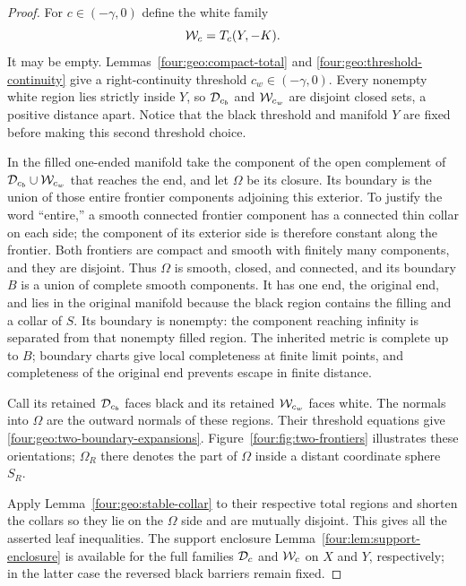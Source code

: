 \begin{proof}
For $c\in(-\gamma,0)$ define the white family
\[
 \mathcal W_c=T_c(Y,-K).
\]
It may be empty.  Lemmas~\ref{four:geo:compact-total} and
\ref{four:geo:threshold-continuity} give a right-continuity threshold
$c_w\in(-\gamma,0)$.  Every nonempty white region lies strictly inside
$Y$, so $\mathcal D_{c_b}$ and $\mathcal W_{c_w}$ are disjoint closed sets, a positive
distance apart.  Notice that the black threshold and manifold $Y$ are
fixed before making this second threshold choice.

In the filled one-ended manifold take the component of the open
complement of $\mathcal D_{c_b}\cup\mathcal W_{c_w}$ that reaches the end, and let
$\Omega$ be its closure.  Its boundary is the union of those entire
frontier components adjoining this exterior.  To justify the word
``entire,'' a smooth connected frontier component has a connected thin
collar on each side; the component of its exterior side is therefore
constant along the frontier.  Both frontiers are compact and smooth with
finitely many components, and they are disjoint.  Thus $\Omega$ is smooth,
closed, and connected, and its boundary $B$ is a union of complete smooth
components.  It has one end, the original end, and lies in the original
manifold because the black region contains the filling and a collar of
$S$.  Its boundary is nonempty: the component reaching infinity is
separated from that nonempty filled region.  The inherited metric is
complete up to $B$; boundary charts give local completeness at finite
limit points, and completeness of the original end prevents escape in
finite distance.

Call its retained $\mathcal D_{c_b}$ faces black and its retained $\mathcal W_{c_w}$
faces white.  The normals into $\Omega$ are the outward normals of these
regions.  Their threshold equations give
\eqref{four:geo:two-boundary-expansions}.  Figure~\ref{four:fig:two-frontiers}
illustrates these orientations; $\Omega_R$ there denotes the part of
$\Omega$ inside a distant coordinate sphere $S_R$.

Apply
Lemma~\ref{four:geo:stable-collar} to their respective total regions and shorten
the collars so they lie on the $\Omega$ side and are mutually disjoint.
This gives all the asserted leaf inequalities.  The support enclosure
Lemma~\ref{four:lem:support-enclosure} is available for the full families
$\mathcal D_c$ and $\mathcal W_c$ on $X$ and $Y$, respectively; in the latter case the
reversed black barriers remain fixed.


\end{proof}

